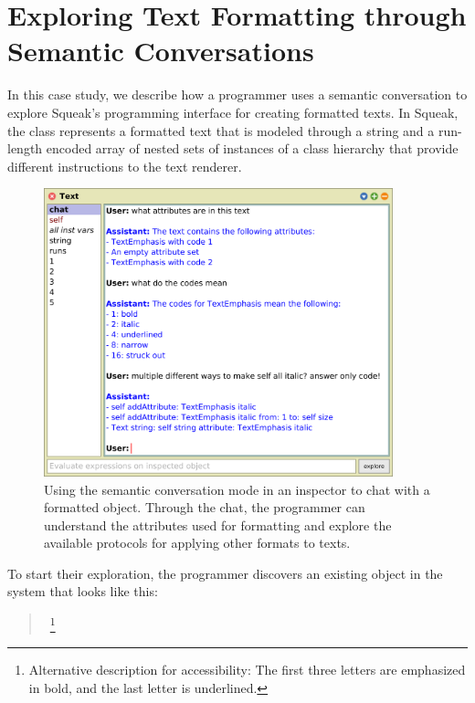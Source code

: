 
\section{Exploring Text Formatting through Semantic Conversations}
\label{sec:application/conversation}

In this case study, we describe how a programmer uses a semantic conversation to explore Squeak's programming interface for creating formatted texts.
In Squeak, the  class represents a formatted text that is modeled through a string and a run-length encoded array of nested sets of instances of a  class hierarchy that provide different instructions to the text renderer.

\FloatBarrier
\begin{figure}[t]
	\centering
	\includegraphics[width=0.9\textwidth]{chapters/08_application/02_conversation/text.png}
	\caption[Using the semantic conversation mode in an inspector to chat with a formatted  object.]{
		Using the semantic conversation mode in an inspector to chat with a formatted  object.
		Through the chat, the programmer can understand the attributes used for formatting and explore the available protocols for applying other formats to texts.
	}
	\label{fig:application/conversation/text}
\end{figure}

To start their exploration, the programmer discovers an existing  object in the system that looks like this:

\begin{quote}
	\,%
	\footnote{Alternative description for accessibility: The first three letters are emphasized in bold, and the last letter is underlined.}
\end{quote}

